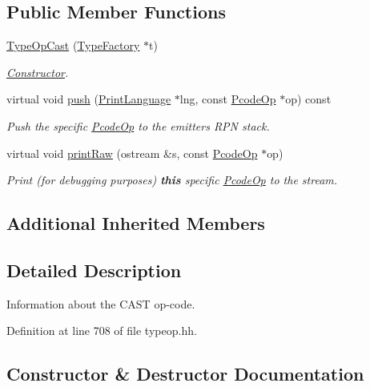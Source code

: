 \subsection*{Public Member Functions}
\begin{DoxyCompactItemize}
\item 
\mbox{\hyperlink{class_type_op_cast_a2839ea94cc7e358614ccf708b619d104}{Type\+Op\+Cast}} (\mbox{\hyperlink{class_type_factory}{Type\+Factory}} $\ast$t)
\begin{DoxyCompactList}\small\item\em \mbox{\hyperlink{class_constructor}{Constructor}}. \end{DoxyCompactList}\item 
virtual void \mbox{\hyperlink{class_type_op_cast_a18ea67d947c8f9c869a6566164590a6d}{push}} (\mbox{\hyperlink{class_print_language}{Print\+Language}} $\ast$lng, const \mbox{\hyperlink{class_pcode_op}{Pcode\+Op}} $\ast$op) const
\begin{DoxyCompactList}\small\item\em Push the specific \mbox{\hyperlink{class_pcode_op}{Pcode\+Op}} to the emitter\textquotesingle{}s R\+PN stack. \end{DoxyCompactList}\item 
virtual void \mbox{\hyperlink{class_type_op_cast_a4cab77a0e4ca4568cea8b4789487b531}{print\+Raw}} (ostream \&s, const \mbox{\hyperlink{class_pcode_op}{Pcode\+Op}} $\ast$op)
\begin{DoxyCompactList}\small\item\em Print (for debugging purposes) {\bfseries{this}} specific \mbox{\hyperlink{class_pcode_op}{Pcode\+Op}} to the stream. \end{DoxyCompactList}\end{DoxyCompactItemize}
\subsection*{Additional Inherited Members}


\subsection{Detailed Description}
Information about the C\+A\+ST op-\/code. 

Definition at line 708 of file typeop.\+hh.



\subsection{Constructor \& Destructor Documentation}
\mbox{\label{class_type_op_cast_a2839ea94cc7e358614ccf708b619d104}} 

